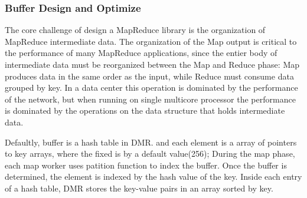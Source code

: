 \subsubsection{Buffer Design and Optimize}
The core challenge of design a MapReduce library 
is the organization of MapReduce
intermediate data.
The organization of the Map output is critical to the
performance of many MapReduce applications, 
since the entier body of intermediate data must be
reorganized between the Map and Reduce phase:
Map produces data in the same order as the input,
while Reduce must consume data grouped by key.\cite{mao2010metis}
In a data center this operation is dominated by
the performance of the network, but when running 
on single multicore processor the performance
is dominated by the operations on the data structure
that holds intermediate data.



Defaultly, buffer is a hash table in DMR.
and each element is a array of pointers to key arrays,
where the fixed is by a default value(256);
During the map phase, each map worker uses patition function
to index the buffer.
Once the buffer is determined, 
the element is indexed by the hash value of the key.
Inside each entry of a hash table,
DMR stores the key-value pairs in an array sorted by key.

